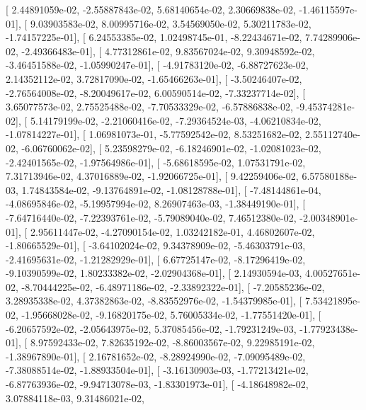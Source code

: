 \documentclass{article}
\begin{document}
       [  2.44891059e-02,  -2.55887843e-02,   5.68140654e-02,
          2.30669838e-02,  -1.46115597e-01],
       [  9.03903583e-02,   8.00995716e-02,   3.54569050e-02,
          5.30211783e-02,  -1.74157225e-01],
       [  6.24553385e-02,   1.02498745e-01,  -8.22434671e-02,
          7.74289906e-02,  -2.49366483e-01],
       [  4.77312861e-02,   9.83567024e-02,   9.30948592e-02,
         -3.46451588e-02,  -1.05990247e-01],
       [ -4.91783120e-02,  -6.88727623e-02,   2.14352112e-02,
          3.72817090e-02,  -1.65466263e-01],
       [ -3.50246407e-02,  -2.76564008e-02,  -8.20049617e-02,
          6.00590514e-02,  -7.33237714e-02],
       [  3.65077573e-02,   2.75525488e-02,  -7.70533329e-02,
         -6.57886838e-02,  -9.45374281e-02],
       [  5.14179199e-02,  -2.21060416e-02,  -7.29364524e-03,
         -4.06210834e-02,  -1.07814227e-01],
       [  1.06981073e-01,  -5.77592542e-02,   8.53251682e-02,
          2.55112740e-02,  -6.06760062e-02],
       [  5.23598279e-02,  -6.18246901e-02,  -1.02081023e-02,
         -2.42401565e-02,  -1.97564986e-01],
       [ -5.68618595e-02,   1.07531791e-02,   7.31713946e-02,
          4.37016889e-02,  -1.92066725e-01],
       [  9.42259406e-02,   6.57580188e-03,   1.74843584e-02,
         -9.13764891e-02,  -1.08128788e-01],
       [ -7.48144861e-04,  -4.08695846e-02,  -5.19957994e-02,
          8.26907463e-03,  -1.38449190e-01],
       [ -7.64716440e-02,  -7.22393761e-02,  -5.79089040e-02,
          7.46512380e-02,  -2.00348901e-01],
       [  2.95611447e-02,  -4.27090154e-02,   1.03242182e-01,
          4.46802607e-02,  -1.80665529e-01],
       [ -3.64102024e-02,   9.34378909e-02,  -5.46303791e-03,
         -2.41695631e-02,  -1.21282929e-01],
       [  6.67725147e-02,  -8.17296419e-02,  -9.10390599e-02,
          1.80233382e-02,  -2.02904368e-01],
       [  2.14930594e-03,   4.00527651e-02,  -8.70444225e-02,
         -6.48971186e-02,  -2.33892322e-01],
       [ -7.20585236e-02,   3.28935338e-02,   4.37382863e-02,
         -8.83552976e-02,  -1.54379985e-01],
       [  7.53421895e-02,  -1.95668028e-02,  -9.16820175e-02,
          5.76005334e-02,  -1.77551420e-01],
       [ -6.20657592e-02,  -2.05643975e-02,   5.37085456e-02,
         -1.79231249e-03,  -1.77923438e-01],
       [  8.97592433e-02,   7.82635192e-02,  -8.86003567e-02,
          9.22985191e-02,  -1.38967890e-01],
       [  2.16781652e-02,  -8.28924990e-02,  -7.09095489e-02,
         -7.38088514e-02,  -1.88933504e-01],
       [ -3.16130903e-03,  -1.77213421e-02,  -6.87763936e-02,
         -9.94713078e-03,  -1.83301973e-01],
       [ -4.18648982e-02,   3.07884118e-03,   9.31486021e-02,
\end{document}
